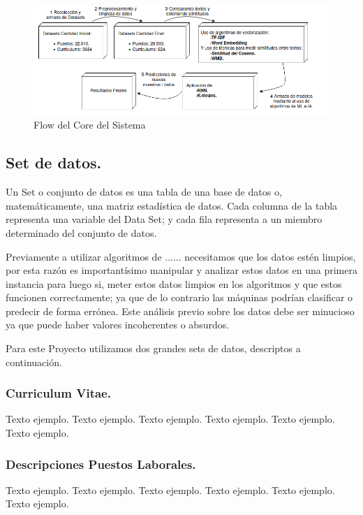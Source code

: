 \documentclass[12pt,a4paper]{article}
\begin{document}
\begin{figure}[h]    %
  \centering
  \includegraphics[width=1\textwidth]{images/flow-core.png} 	%
  \caption{Flow del Core del Sistema}  
  \label{fig:FlowCoreSystem}
\end{figure}

\subsection{Set de datos.}
Un Set o conjunto de datos es una tabla de una base de datos o, matemáticamente, una matriz estadística de datos. Cada columna de la tabla representa una variable del Data Set; y cada fila representa a un miembro determinado del conjunto de datos.

Previamente a utilizar algoritmos de ......
necesitamos que los datos estén limpios, por esta razón es importantísimo manipular y analizar estos
datos en una primera instancia para luego si, meter estos datos limpios en los algoritmos y que estos
funcionen correctamente; ya que de lo contrario las máquinas podrían clasificar o predecir de forma
errónea. Este análisis previo sobre los datos debe ser minucioso ya que puede haber valores
incoherentes o absurdos.

Para este Proyecto utilizamos dos grandes sets de datos, descriptos a continuación.

\subsubsection{Curriculum Vitae.}
Texto ejemplo. Texto ejemplo. Texto ejemplo. Texto ejemplo. Texto ejemplo. Texto ejemplo.

\subsubsection{Descripciones Puestos Laborales.}
Texto ejemplo. Texto ejemplo. Texto ejemplo. Texto ejemplo. Texto ejemplo. Texto ejemplo.
\end{document}
